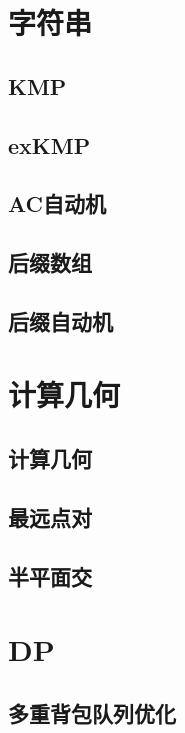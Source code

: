\documentclass[10pt]{article}
\begin{document}
\section{字符串}
\subsection{KMP}

\subsection{exKMP}

\subsection{AC自动机}

\subsection{后缀数组}

\subsection{后缀自动机}


\section{计算几何}
\subsection{计算几何}

\subsection{最远点对}

\subsection{半平面交}

\section{DP}
\subsection{多重背包队列优化}
\end{document}

